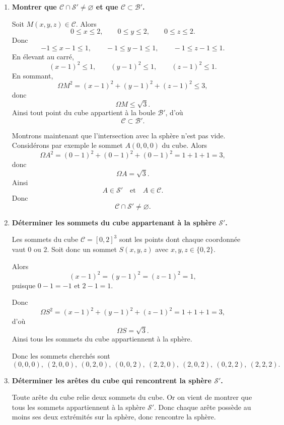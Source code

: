 \documentclass[11pt,a4paper]{article}
\newcommand{\Boule}{\mathcal{B}}
\newcommand{\Sphere}{\mathcal{S}}
\newcommand{\Cube}{\mathcal{C}}
\begin{document}
\begin{enumerate}[label=\textbf{\arabic*.},resume]
    \item \textbf{Montrer que \(\Cube\cap \Sphere'\neq\varnothing\) et que \(\Cube\subset \Boule'\).}

    Soit \(M(x,y,z)\in \Cube\). Alors
    \[
    0\le x\le 2,\qquad 0\le y\le 2,\qquad 0\le z\le 2.
    \]
    Donc
    \[
    -1\le x-1\le 1,\qquad -1\le y-1\le 1,\qquad -1\le z-1\le 1.
    \]
    En élevant au carré,
    \[
    (x-1)^2\le 1,\qquad (y-1)^2\le 1,\qquad (z-1)^2\le 1.
    \]
    En sommant,
    \[
    \Omega M^2=(x-1)^2+(y-1)^2+(z-1)^2\le 3,
    \]
    donc
    \[
    \Omega M\le \sqrt3.
    \]
    Ainsi tout point du cube appartient à la boule \(\Boule'\), d'où
    \[
    \boxed{\Cube\subset \Boule'.}
    \]

    Montrons maintenant que l'intersection avec la sphère n'est pas vide.  
    Considérons par exemple le sommet \(A(0,0,0)\) du cube. Alors
    \[
    \Omega A^2=(0-1)^2+(0-1)^2+(0-1)^2=1+1+1=3,
    \]
    donc
    \[
    \Omega A=\sqrt3.
    \]
    Ainsi
    \[
    A\in \Sphere'
    \quad\text{et}\quad
    A\in \Cube.
    \]
    Donc
    \[
    \boxed{\Cube\cap \Sphere'\neq\varnothing.}
    \]

    \item \textbf{Déterminer les sommets du cube appartenant à la sphère \(\Sphere'\).}

    Les sommets du cube \(\Cube=[0,2]^3\) sont les points dont chaque coordonnée vaut \(0\) ou \(2\).  
    Soit donc un sommet \(S(x,y,z)\) avec \(x,y,z\in\{0,2\}\).

    Alors
    \[
    (x-1)^2=(y-1)^2=(z-1)^2=1,
    \]
    puisque \(0-1=-1\) et \(2-1=1\).

    Donc
    \[
    \Omega S^2=(x-1)^2+(y-1)^2+(z-1)^2=1+1+1=3,
    \]
    d'où
    \[
    \Omega S=\sqrt3.
    \]
    Ainsi tous les sommets du cube appartiennent à la sphère.

    Donc les sommets cherchés sont
    \[
    \boxed{(0,0,0),\ (2,0,0),\ (0,2,0),\ (0,0,2),\ (2,2,0),\ (2,0,2),\ (0,2,2),\ (2,2,2).}
    \]

    \item \textbf{Déterminer les arêtes du cube qui rencontrent la sphère \(\Sphere'\).}

    Toute arête du cube relie deux sommets du cube. Or on vient de montrer que tous les sommets appartiennent à la sphère \(\Sphere'\).  
    Donc chaque arête possède au moins ses deux extrémités sur la sphère, donc rencontre la sphère.


\end{enumerate}
\end{document}
